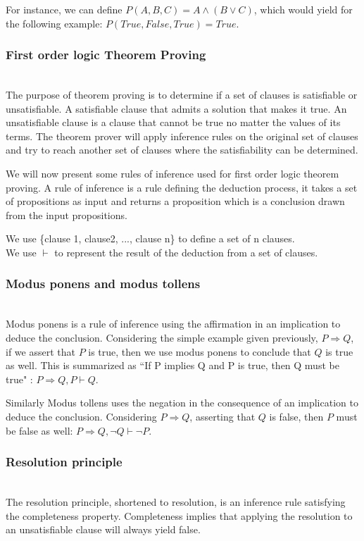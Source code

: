 For instance, we can define $P(A,B,C) = A \wedge (B \vee C)$, which would yield for the following example: $P(True,False,True)=True$.

\subsubsection{First order logic Theorem Proving}\textbf{\\}
The purpose of theorem proving is to determine if a set of clauses is satisfiable or unsatisfiable.
A satisfiable clause that admits a solution that makes it true.
An unsatisfiable clause is a clause that cannot be true no matter the values of its terms.
The theorem prover will apply inference rules on the original set of clauses and try to reach another set of clauses where the satisfiability can be determined.

We will now present some rules of inference used for first order logic theorem proving.
A rule of inference is a rule defining the deduction process, it takes a set of propositions as input and returns a proposition which is a conclusion drawn from the input propositions.

We use \{clause 1, clause2, ..., clause n\} to define a set of n clauses.\\
We use $\vdash$ to represent the result of the deduction from a set of clauses.

\subsubsection{Modus ponens and modus tollens}\textbf{\\}
Modus ponens is a rule of inference using the affirmation in an implication to deduce the conclusion.
Considering the simple example given previously, $P \Rightarrow Q$, if we assert that $P$ is true, then we use modus ponens to conclude that $Q$ is true as well. This is summarized as ``If P implies Q and P is true, then Q must be true" : $P \Rightarrow Q, P \vdash Q$.

Similarly Modus tollens uses the negation in the consequence of an implication to deduce the conclusion.
Considering $P \Rightarrow Q$, asserting that $Q$ is false, then $P$ must be false as well: $P \Rightarrow Q, \neg Q \vdash \neg P$.

\subsubsection{Resolution principle}\textbf{\\}
The resolution principle, shortened to resolution, is an inference rule satisfying the completeness property. Completeness implies that applying the resolution to an unsatisfiable clause will always yield false. 

